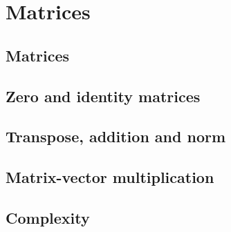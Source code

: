 \section{Matrices}
\subsection{Matrices}
\subsection{Zero and identity matrices}
\subsection{Transpose, addition and norm}
\subsection{Matrix-vector multiplication}
\subsection{Complexity}